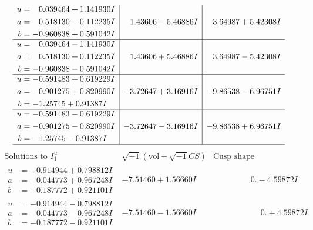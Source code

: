 \documentclass[1p]{elsarticle_modified}
\theoremstyle{definition}
\newcommand{\I}{\sqrt{-1}}
\begin{document}
$$\begin{array}{c|c|c}
\begin{aligned}
u &= \phantom{-}0.039464 + 1.141930 I \\
a &= \phantom{-}0.518130 - 0.112235 I \\
b &= -0.960838 + 0.591042 I\end{aligned}
 & \phantom{-}1.43606 - 5.46886 I & \phantom{-}3.64987 + 5.42308 I \\ \hline\begin{aligned}
u &= \phantom{-}0.039464 - 1.141930 I \\
a &= \phantom{-}0.518130 + 0.112235 I \\
b &= -0.960838 - 0.591042 I\end{aligned}
 & \phantom{-}1.43606 + 5.46886 I & \phantom{-}3.64987 - 5.42308 I \\ \hline\begin{aligned}
u &= -0.591483 + 0.619229 I \\
a &= -0.901275 + 0.820990 I \\
b &= -1.25745 + 0.91387 I\end{aligned}
 & -3.72647 + 3.16916 I & -9.86538 - 6.96751 I \\ \hline\begin{aligned}
u &= -0.591483 - 0.619229 I \\
a &= -0.901275 - 0.820990 I \\
b &= -1.25745 - 0.91387 I\end{aligned}
 & -3.72647 - 3.16916 I & -9.86538 + 6.96751 I\\
 \hline 
 \end{array}$$\newpage$$\begin{array}{c|c|c}  
\text{Solutions to }I^u_{1}& \I (\text{vol} + \sqrt{-1}CS) & \text{Cusp shape}\\
 \hline 
\begin{aligned}
u &= -0.914944 + 0.798812 I \\
a &= -0.044773 + 0.967248 I \\
b &= -0.187772 + 0.921101 I\end{aligned}
 & -7.51460 + 1.56660 I & \phantom{-0.000000 } 0. - 4.59872 I \\ \hline\begin{aligned}
u &= -0.914944 - 0.798812 I \\
a &= -0.044773 - 0.967248 I \\
b &= -0.187772 - 0.921101 I\end{aligned}
 & -7.51460 - 1.56660 I & \phantom{-0.000000 -}0. + 4.59872 I \\ \hline\begin{aligned}

\end{aligned}
\end{array}$$
\end{document}
